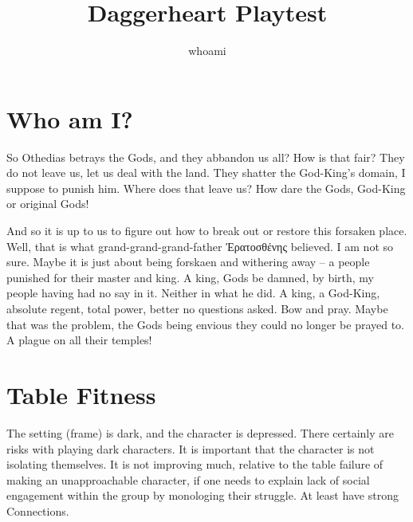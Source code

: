 \documentclass[a4paper, twoside, russian, ngerman]{book}%
\title{Daggerheart Playtest}
\author{whoami}
\begin{document}
\maketitle

\tableofcontents

\setlength{\parskip}{1ex}

\chapter{Who am I?}

So Othedias betrays the Gods, and they abbandon us all? How is that fair? They do not leave us, let us deal with the land. They shatter the God-King's domain, I suppose to punish him. Where does that leave us? How dare the Gods, God-King or original Gods!

And so it is up to us to figure out how to break out or restore this forsaken place. Well, that is what grand-grand-grand-father Ἐρατοσθένης believed. I am not so sure. Maybe it is just about being forskaen and withering away -- a people punished for their master and king. A king, Gods be damned, by birth, my people having had no say in it. Neither in what he did. A king, a God-King, absolute regent, total power, better no questions asked. Bow and pray. Maybe that was the problem, the Gods being envious they could no longer be prayed to. A plague on all their temples!


\chapter{Table Fitness}

The setting (frame) is dark, and the character is depressed. There certainly are risks with playing dark characters. It is important that the character is not isolating themselves. It is not improving much, relative to the table failure of making an unapproachable character, if one needs to explain lack of social engagement within the group by monologing their struggle. At least have strong Connections.
\end{document}
